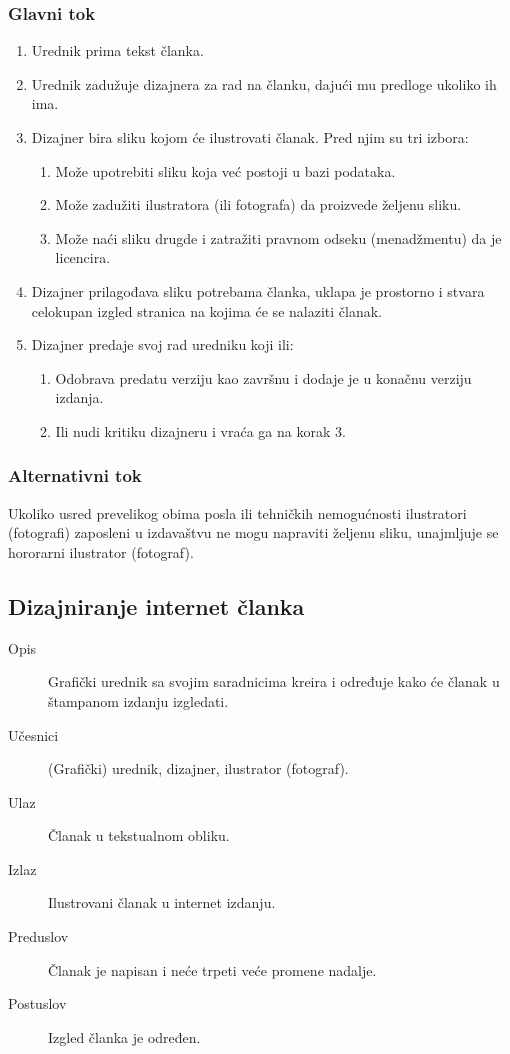 \subsubsection{Glavni tok}
\begin{enumerate} 
\item Urednik prima tekst članka.
\item Urednik zadužuje dizajnera za rad na članku, dajući mu predloge ukoliko ih ima.
\item Dizajner bira sliku kojom će ilustrovati članak. Pred njim su tri izbora:
\begin{enumerate}
\item Može upotrebiti sliku koja već postoji u bazi podataka.
\item Može zadužiti ilustratora (ili fotografa) da proizvede željenu sliku.
\item Može naći sliku drugde i zatražiti pravnom odseku (menadžmentu) da je licencira.
\end{enumerate}
\item Dizajner prilagođava sliku potrebama članka,
uklapa je prostorno i stvara celokupan izgled stranica na kojima će se nalaziti članak.
\item Dizajner predaje svoj rad uredniku koji ili:
\begin{enumerate}
\item Odobrava predatu verziju kao završnu i dodaje je u konačnu verziju izdanja.
\item Ili nudi kritiku dizajneru i vraća ga na korak 3.
\end{enumerate}
\end{enumerate}
\subsubsection{Alternativni tok}
Ukoliko usred prevelikog obima posla ili tehničkih nemogućnosti ilustratori (fotografi) zaposleni u izdavaštvu ne mogu napraviti željenu sliku, unajmljuje se hororarni ilustrator (fotograf).

\subsection{Dizajniranje internet članka}
\begin{description}
\item [Opis] Grafički urednik sa svojim saradnicima kreira i određuje kako će članak u štampanom izdanju izgledati.
\item [Učesnici] (Grafički) urednik, dizajner, ilustrator (fotograf).
\item [Ulaz] Članak u tekstualnom obliku.
\item [Izlaz] Ilustrovani članak u internet izdanju.
\item [Preduslov] Članak je napisan i neće trpeti veće promene nadalje.
\item [Postuslov] Izgled članka je određen.
\end{description}
